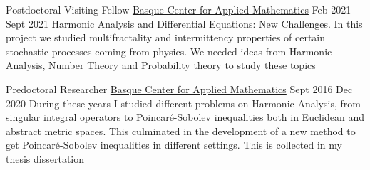 \begin{employment}
    {Postdoctoral Visiting Fellow}
    { \href{http://www.bcamath.org/es/}{Basque Center for Applied Mathematics}}
    {Feb 2021}
    {Sept 2021}
    {Harmonic Analysis and Differential Equations: New Challenges. In this project we studied multifractality and intermittency properties of certain stochastic processes coming from physics. We needed ideas from Harmonic Analysis, Number Theory and Probability theory to study these topics}
\end{employment}

\begin{firstemployment}
    {Predoctoral Researcher}
    { \href{http://www.bcamath.org/es/}{Basque Center for Applied Mathematics}}
    {Sept 2016}
    {Dec 2020}
    {During these years I studied different problems on Harmonic Analysis, from singular integral operators to Poincaré-Sobolev inequalities both in Euclidean and abstract metric spaces. This culminated in the development of a new method to get Poincaré-Sobolev inequalities in different settings. This is collected in my thesis \href{https://bird.bcamath.org/handle/20.500.11824/1206}{dissertation}}
\end{firstemployment}